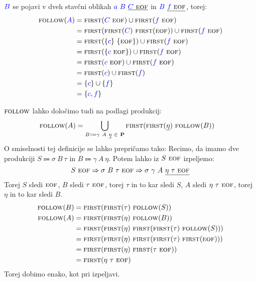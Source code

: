 \documentclass{article}
\newcommand{\FIRST}{\textsc{first}}
\newcommand{\FOLLOW}{\textsc{follow}}
\newcommand{\EOF}{\textsc{eof}}
\newcommand{\Set}[1]{\mathbf{#1}}
\newcommand{\Symbol}[1]{\textcolor{blue}{#1}}
\newcommand{\Productions}{\Set{P}}
\newcommand{\Arrow}{\Coloneq}
\newcommand{\Derive}{\Rightarrow}
\newcommand{\Seq}{\ }
\begin{document}
$\Symbol{B}$ se pojavi v dveh stavčni oblikah $\Symbol{a} \Seq \Symbol{B} \Seq \underline{\Symbol{C} \Seq \EOF}$ in $\Symbol{B} \Seq \underline{\Symbol{f} \Seq \EOF}$, torej:
\begin{align*}
  \FOLLOW(\Symbol{A}) &= \FIRST(\Symbol{C} \Seq \EOF) \cup \FIRST(\Symbol{f} \Seq \EOF)\\
             &= \FIRST(\FIRST(\Symbol{C}) \Seq \FIRST(\EOF)) \cup \FIRST(\Symbol{f} \Seq \EOF)\\
             &= \FIRST(\{\Symbol{c}\} \Seq \{\EOF\}) \cup \FIRST(\Symbol{f} \Seq \EOF)\\
             &= \FIRST(\{\Symbol{c} \Seq \EOF\}) \cup \FIRST(\Symbol{f} \Seq \EOF)\\
             &= \FIRST(\Symbol{c} \Seq \EOF) \cup \FIRST(\Symbol{f} \Seq \EOF)\\
             &= \FIRST(\Symbol{c}) \cup \FIRST(\Symbol{f})\\
             &= \{\Symbol{c}\} \cup \{\Symbol{f}\}\\
             &= \{\Symbol{c}, \Symbol{f}\}
\end{align*}

$\FOLLOW$ lahko določimo tudi na podlagi produkcij:
\begin{align*}
  \FOLLOW(A) &= \bigcup_{B \Arrow \gamma \Seq A \Seq \underline{\eta}\ \in\ \Productions} \FIRST(\FIRST(\underline{\eta}) \Seq \FOLLOW(B))
\end{align*}
O smiselnosti tej definicije se lahko prepričamo tako:
Recimo, da imamo dve produkciji $S \Arrow \sigma \Seq B \Seq \tau$ in $B \Arrow \gamma \Seq A \Seq \eta$.
Potem lahko iz $S \Seq \EOF$ izpeljemo:
\begin{equation*}
  S \Seq \EOF \Derive \sigma \Seq B \Seq \tau \Seq \EOF \Derive \sigma \Seq \gamma \Seq A \Seq \underline{\eta \Seq \tau \Seq \EOF}
\end{equation*}
Torej $S$ sledi $\EOF$, $B$ sledi $\tau \Seq \EOF$, torej $\tau$ in to kar sledi $S$, $A$ sledi $\eta \Seq \tau \Seq \EOF$, torej $\eta$ in to kar sledi $B$.
\begin{align*}
  \FOLLOW(B) &= \FIRST(\FIRST(\tau) \Seq \FOLLOW(S))\\
  \FOLLOW(A) &= \FIRST(\FIRST(\eta) \Seq \FOLLOW(B))\\
   &= \FIRST(\FIRST(\eta) \Seq \FIRST(\FIRST(\tau) \Seq \FOLLOW(S)))\\
   &= \FIRST(\FIRST(\eta) \Seq \FIRST(\FIRST(\tau) \Seq \FIRST(\EOF)))\\
   &= \FIRST(\FIRST(\eta) \Seq \FIRST(\tau \Seq \EOF))\\
   &= \FIRST(\eta \Seq \tau \Seq \EOF)
\end{align*}
Torej dobimo enako, kot pri izpeljavi.
\end{document}
